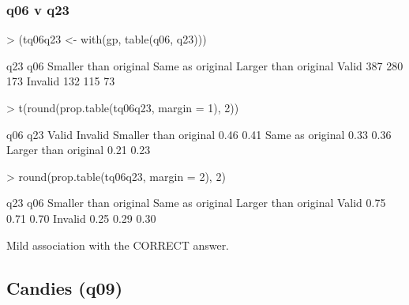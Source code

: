 \documentclass[11pt]{article}
\begin{document}
\subsubsection{q06 v q23}
\label{sec-1-2-3}
\begin{Schunk}
\begin{Sinput}
> (tq06q23 <- with(gp, table(q06, q23)))
\end{Sinput}
\begin{Soutput}
         q23
q06       Smaller than original Same as original Larger than original
  Valid                     387              280                  173
  Invalid                   132              115                   73
\end{Soutput}
\begin{Sinput}
> t(round(prop.table(tq06q23, margin = 1), 2))
\end{Sinput}
\begin{Soutput}
                       q06
q23                     Valid Invalid
  Smaller than original  0.46    0.41
  Same as original       0.33    0.36
  Larger than original   0.21    0.23
\end{Soutput}
\begin{Sinput}
> round(prop.table(tq06q23, margin = 2), 2)
\end{Sinput}
\begin{Soutput}
         q23
q06       Smaller than original Same as original Larger than original
  Valid                    0.75             0.71                 0.70
  Invalid                  0.25             0.29                 0.30
\end{Soutput}
\end{Schunk}

Mild association with the CORRECT answer.

\subsection{Candies (q09)}
\label{sec-1-3}
\end{document}
